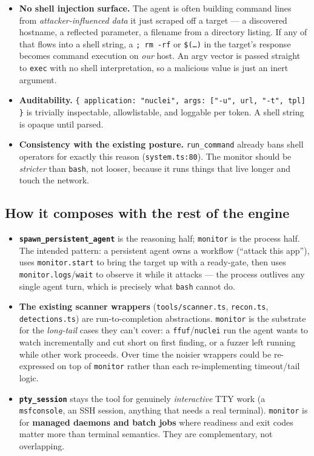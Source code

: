 \documentclass[11pt]{article}
\begin{document}
\begin{itemize}[leftmargin=*]
  \item \textbf{No shell injection surface.} The agent is often building command
  lines from \textit{attacker-influenced data} it just scraped off a target --- a
  discovered hostname, a reflected parameter, a filename from a directory listing.
  If any of that flows into a shell string, a \texttt{; rm -rf} or \texttt{\$(\ldots)}
  in the target's response becomes command execution on \textit{our} host. An
  argv vector is passed straight to \texttt{exec} with no shell interpretation, so
  a malicious value is just an inert argument.
  \item \textbf{Auditability.} \texttt{\{ application: "nuclei", args: ["-u", url,
  "-t", tpl] \}} is trivially inspectable, allowlistable, and loggable per token.
  A shell string is opaque until parsed.
  \item \textbf{Consistency with the existing posture.} \texttt{run\_command}
  already bans shell operators for exactly this reason (\texttt{system.ts:80}).
  The monitor should be \textit{stricter} than \texttt{bash}, not looser, because
  it runs things that live longer and touch the network.
\end{itemize}

\subsection{How it composes with the rest of the engine}

\begin{itemize}[leftmargin=*]
  \item \textbf{\texttt{spawn\_persistent\_agent}} is the reasoning half;
  \texttt{monitor} is the process half. The intended pattern: a persistent agent
  owns a workflow (``attack this app''), uses \texttt{monitor.start} to bring the
  target up with a ready-gate, then uses \texttt{monitor.logs}/\texttt{wait} to
  observe it while it attacks --- the process outlives any single agent turn,
  which is precisely what \texttt{bash} cannot do.
  \item \textbf{The existing scanner wrappers} (\texttt{tools/scanner.ts},
  \texttt{recon.ts}, \texttt{detections.ts}) are run-to-completion abstractions.
  \texttt{monitor} is the substrate for the \textit{long-tail} cases they can't
  cover: a \texttt{ffuf}/\texttt{nuclei} run the agent wants to watch incrementally
  and cut short on first finding, or a fuzzer left running while other work
  proceeds. Over time the noisier wrappers could be re-expressed on top of
  \texttt{monitor} rather than each re-implementing timeout/tail logic.
  \item \textbf{\texttt{pty\_session}} stays the tool for genuinely
  \textit{interactive} TTY work (a \texttt{msfconsole}, an SSH session, anything
  that needs a real terminal). \texttt{monitor} is for \textbf{managed daemons and
  batch jobs} where readiness and exit codes matter more than terminal semantics.
  They are complementary, not overlapping.
\end{itemize}
\end{document}
